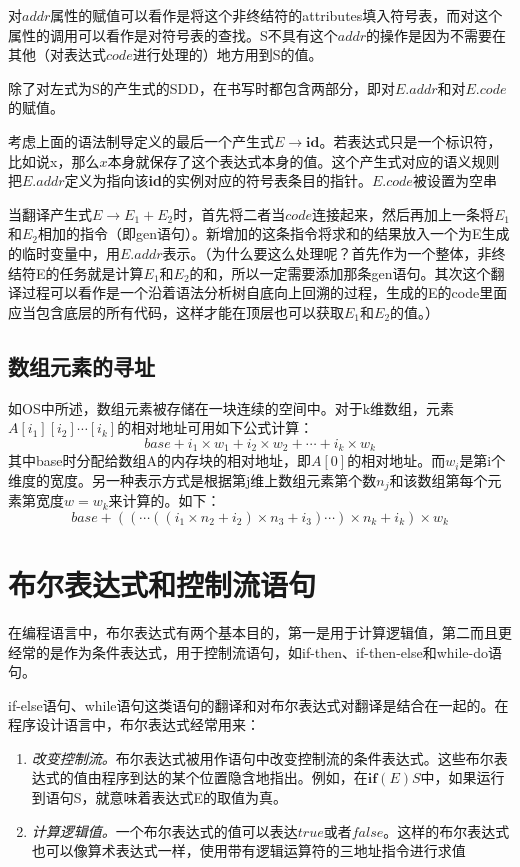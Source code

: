 \documentclass[]{report}
\begin{document}
			对$addr$属性的赋值可以看作是将这个非终结符的attributes填入符号表，而对这个属性的调用可以看作是对符号表的查找。S不具有这个$addr$的操作是因为不需要在其他（对表达式$code$进行处理的）地方用到S的值。\par
			除了对左式为S的产生式的SDD，在书写时都包含两部分，即对$E.addr$和对$E.code$的赋值。\par
			考虑上面的语法制导定义的最后一个产生式$E\to\mathbf{id}$。若表达式只是一个标识符，比如说x，那么$x$本身就保存了这个表达式本身的值。这个产生式对应的语义规则把$E.addr$定义为指向该\textbf{id}的实例对应的符号表条目的指针。$E.code$被设置为空串\par
			当翻译产生式$E\to E_1+E_2$时，首先将二者当$code$连接起来，然后再加上一条将$E_1$和$E_2$相加的指令（即gen语句）。新增加的这条指令将求和的结果放入一个为E生成的临时变量中，用$E.addr$表示。（为什么要这么处理呢？首先作为一个整体，非终结符E的任务就是计算$E_1$和$E_2$的和，所以一定需要添加那条gen语句。其次这个翻译过程可以看作是一个沿着语法分析树自底向上回溯的过程，生成的E的code里面应当包含底层的所有代码，这样才能在顶层也可以获取$E_1$和$E_2$的值。）
		\subsection{数组元素的寻址}
			如OS中所述，数组元素被存储在一块连续的空间中。对于k维数组，元素$A[i_1][i_2]\cdots[i_k]$的相对地址可用如下公式计算：
			\[base+i_1\times w_1+i_2\times w_2+\cdots+i_k\times w_k\]
			其中base时分配给数组A的内存块的相对地址，即$A[0]$的相对地址。而$w_i$是第i个维度的宽度。另一种表示方式是根据第j维上数组元素第个数$n_j$和该数组第每个元素第宽度$w=w_k$来计算的。如下：
			\[base+((\cdots((i_1\times n_2+i_2)\times n_3+i_3)\cdots)\times n_k+i_k)\times w_k\]
	\section{布尔表达式和控制流语句}
		在编程语言中，布尔表达式有两个基本目的，第一是用于计算逻辑值，第二而且更经常的是作为条件表达式，用于控制流语句，如if-then、if-then-else和while-do语句。\par
		if-else语句、while语句这类语句的翻译和对布尔表达式对翻译是结合在一起的。在程序设计语言中，布尔表达式经常用来：
		\begin{enumerate}
			\item \textit{改变控制流。}布尔表达式被用作语句中改变控制流的条件表达式。这些布尔表达式的值由程序到达的某个位置隐含地指出。例如，在$\textbf{if}(E)S$中，如果运行到语句S，就意味着表达式E的取值为真。
			\item \textit{计算逻辑值。}一个布尔表达式的值可以表达$true$或者$false$。这样的布尔表达式也可以像算术表达式一样，使用带有逻辑运算符的三地址指令进行求值
		\end{enumerate}
\end{document}
